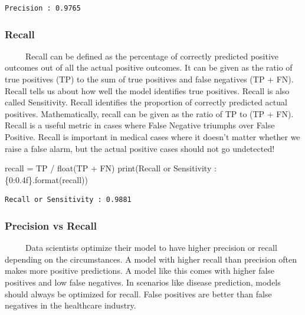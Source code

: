 \documentclass[
  letterpaper,
  DIV=11,
  numbers=noendperiod]{scrreprt}
\newenvironment{Shaded}{\begin{snugshade}}{\end{snugshade}}
\newcommand{\BuiltInTok}[1]{\textcolor[rgb]{0.00,0.23,0.31}{#1}}
\newcommand{\NormalTok}[1]{\textcolor[rgb]{0.00,0.23,0.31}{#1}}
\newcommand{\OperatorTok}[1]{\textcolor[rgb]{0.37,0.37,0.37}{#1}}
\newcommand{\SpecialCharTok}[1]{\textcolor[rgb]{0.37,0.37,0.37}{#1}}
\newcommand{\StringTok}[1]{\textcolor[rgb]{0.13,0.47,0.30}{#1}}
\begin{document}
\begin{verbatim}
Precision : 0.9765
\end{verbatim}

\subsubsection{Recall}\label{recall}

~~~~~Recall can be defined as the percentage of correctly predicted
positive outcomes out of all the actual positive outcomes. It can be
given as the ratio of true positives (TP) to the sum of true positives
and false negatives (TP + FN). Recall tells us about how well the model
identifies true positives. Recall is also called Sensitivity. Recall
identifies the proportion of correctly predicted actual positives.
Mathematically, recall can be given as the ratio of TP to (TP + FN).
Recall is a useful metric in cases where False Negative triumphs over
False Positive. Recall is important in medical cases where it doesn't
matter whether we raise a false alarm, but the actual positive cases
should not go undetected!

\begin{Shaded}
\begin{Highlighting}[]
\NormalTok{recall }\OperatorTok{=}\NormalTok{ TP }\OperatorTok{/} \BuiltInTok{float}\NormalTok{(TP }\OperatorTok{+}\NormalTok{ FN)}
\BuiltInTok{print}\NormalTok{(}\StringTok{\textquotesingle{}Recall or Sensitivity : }\SpecialCharTok{\{0:0.4f\}}\StringTok{\textquotesingle{}}\NormalTok{.}\BuiltInTok{format}\NormalTok{(recall))}
\end{Highlighting}
\end{Shaded}

\begin{verbatim}
Recall or Sensitivity : 0.9881
\end{verbatim}

\subsubsection{Precision vs Recall}\label{precision-vs-recall}

~~~~~Data scientists optimize their model to have higher precision or
recall depending on the circumstances. A model with higher recall than
precision often makes more positive predictions. A model like this comes
with higher false positives and low false negatives. In scenarios like
disease prediction, models should always be optimized for recall. False
positives are better than false negatives in the healthcare industry.
\end{document}
